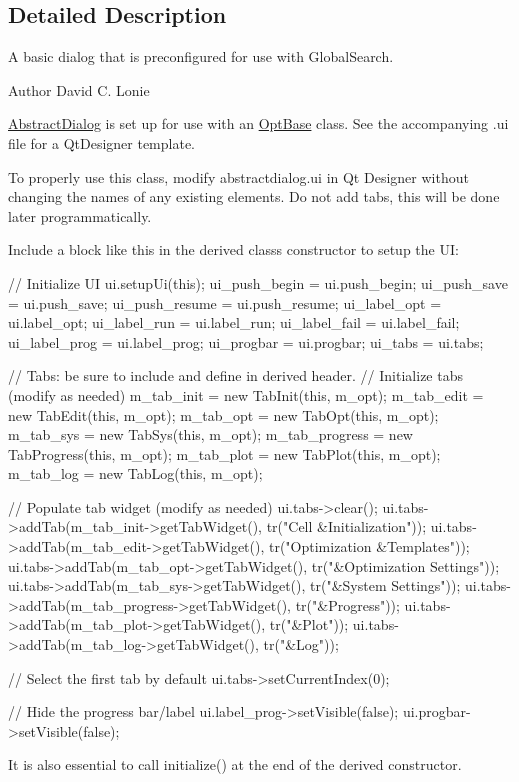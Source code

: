 \subsection{Detailed Description}
A basic dialog that is preconfigured for use with Global\+Search. 

\begin{DoxyAuthor}{Author}
David C. Lonie
\end{DoxyAuthor}
\hyperlink{classGlobalSearch_1_1AbstractDialog}{Abstract\+Dialog} is set up for use with an \hyperlink{classGlobalSearch_1_1OptBase}{Opt\+Base} class. See the accompanying .ui file for a Qt\+Designer template.

To properly use this class, modify abstractdialog.\+ui in Qt Designer without changing the names of any existing elements. Do not add tabs, this will be done later programmatically.

Include a block like this in the derived class\textquotesingle{}s constructor to setup the U\+I\+: \begin{DoxyVerb}    // Initialize UI
    ui.setupUi(this);
    ui_push_begin   = ui.push_begin;
    ui_push_save    = ui.push_save;
    ui_push_resume  = ui.push_resume;
    ui_label_opt    = ui.label_opt;
    ui_label_run    = ui.label_run;
    ui_label_fail   = ui.label_fail;
    ui_label_prog   = ui.label_prog;
    ui_progbar      = ui.progbar;
    ui_tabs         = ui.tabs;

    // Tabs: be sure to include and define in derived header.
    // Initialize tabs (modify as needed)
    m_tab_init     = new TabInit(this, m_opt);
    m_tab_edit     = new TabEdit(this, m_opt);
    m_tab_opt      = new TabOpt(this, m_opt);
    m_tab_sys      = new TabSys(this, m_opt);
    m_tab_progress = new TabProgress(this, m_opt);
    m_tab_plot     = new TabPlot(this, m_opt);
    m_tab_log      = new TabLog(this, m_opt);

    // Populate tab widget (modify as needed)
    ui.tabs->clear();
    ui.tabs->addTab(m_tab_init->getTabWidget(),     tr("Cell &Initialization"));
    ui.tabs->addTab(m_tab_edit->getTabWidget(),     tr("Optimization &Templates"));
    ui.tabs->addTab(m_tab_opt->getTabWidget(),      tr("&Optimization Settings"));
    ui.tabs->addTab(m_tab_sys->getTabWidget(),      tr("&System Settings"));
    ui.tabs->addTab(m_tab_progress->getTabWidget(), tr("&Progress"));
    ui.tabs->addTab(m_tab_plot->getTabWidget(),     tr("&Plot"));
    ui.tabs->addTab(m_tab_log->getTabWidget(),      tr("&Log"));

    // Select the first tab by default
    ui.tabs->setCurrentIndex(0);

    // Hide the progress bar/label
    ui.label_prog->setVisible(false);
    ui.progbar->setVisible(false);
\end{DoxyVerb}
 \begin{DoxyVerb} It is also essential to call initialize() at the end of the
 derived constructor.\end{DoxyVerb}
 

